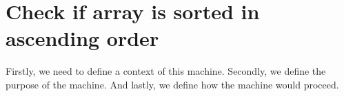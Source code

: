\section{Check if array is sorted in ascending order}

Firstly, we need to define a context of this machine. Secondly, we define the purpose of the machine. And lastly, we define how the machine would proceed.



